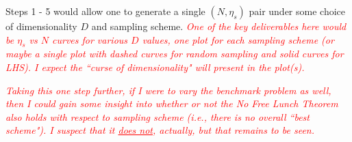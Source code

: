 \documentclass[12pt, letterpaper]{report}
\theoremstyle{definition}
\begin{document}
\noindent Steps 1 - 5 would allow one to generate a single $(N, \eta_s)$ pair under some choice of dimensionality $D$ and sampling scheme. \textcolor{red}{\textit{One of the key deliverables here would be $\eta_s$ vs $N$ curves for various $D$ values, one plot for each sampling scheme (or maybe a single plot with dashed curves for random sampling and solid curves for LHS). I expect the ``curse of dimensionality" will present in the plot(s).}}\par 
\vspace{4mm}
\textcolor{red}{\textit{Taking this one step further, if I were to vary the benchmark problem as well, then I could gain some insight into whether or not the No Free Lunch Theorem also holds with respect to sampling scheme (i.e., there is no overall ``best scheme"). I suspect that it \underline{does not}, actually, but that remains to be seen.}}



% 
\end{document}

